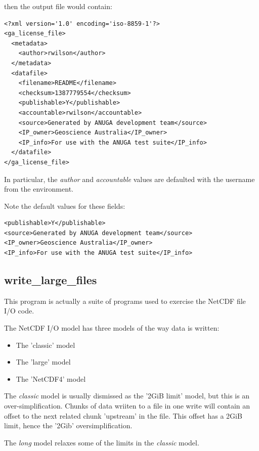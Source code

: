 \documentclass{manual}
\begin{document}
then the output file  would contain:

\begin{verbatim}
<?xml version='1.0' encoding='iso-8859-1'?>
<ga_license_file>
  <metadata>
    <author>rwilson</author>
  </metadata>
  <datafile>
    <filename>README</filename>
    <checksum>1387779554</checksum>
    <publishable>Y</publishable>
    <accountable>rwilson</accountable>
    <source>Generated by ANUGA development team</source>
    <IP_owner>Geoscience Australia</IP_owner>
    <IP_info>For use with the ANUGA test suite</IP_info>
  </datafile>
</ga_license_file>
\end{verbatim}

In particular, the \emph{author} and \emph{accountable} values are defaulted with
the username from the environment.

Note the default values for these fields:

\begin{verbatim}
<publishable>Y</publishable>
<source>Generated by ANUGA development team</source>
<IP_owner>Geoscience Australia</IP_owner>
<IP_info>For use with the ANUGA test suite</IP_info>
\end{verbatim}

\pagebreak

\subsection{write_large_files}
\label{subsec:write_large_files}

This program is actually a suite of programs used to exercise the NetCDF file I/O code.

The NetCDF I/O model has three models of the way data is written:
\begin{itemize}
  \item The 'classic' model
  \item The 'large' model
  \item The 'NetCDF4' model
\end{itemize}

The \emph{classic} model is usually dismissed as the '2GiB limit' model, but this
is an over-simplification.  Chunks of data wriiten to a file in one write will contain
an offset to the next related chunk 'upstream' in the file.  This offset has a 2GiB
limit, hence the '2Gib' oversimplification.

The \emph{long} model relaxes some of the limits in the \emph{classic} model.
\end{document}
